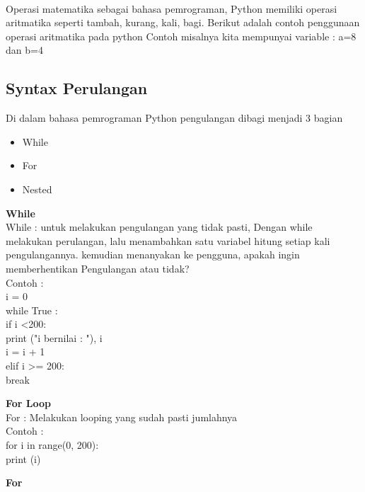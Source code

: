 \documentclass{article}
\begin{document}
\paragraph{}
Operasi matematika sebagai bahasa pemrograman, Python memiliki operasi aritmatika seperti tambah, kurang, kali, bagi. Berikut adalah contoh penggunaan operasi aritmatika pada python
Contoh misalnya kita mempunyai variable : a=8 dan b=4\\

\subsection{Syntax Perulangan}

\item Di dalam bahasa pemrograman Python pengulangan dibagi menjadi 3 bagian

\begin{itemize}
    \item While 
    \item For 
    \item Nested
\end{itemize}

\item \textbf{While} \\ 
While : untuk melakukan pengulangan yang tidak pasti, Dengan while melakukan perulangan, lalu menambahkan satu variabel hitung setiap kali pengulangannya. kemudian menanyakan ke pengguna, apakah ingin memberhentikan Pengulangan atau tidak?\\
Contoh :\\
i = 0\\
while True :\\
    if i \textless 200:\\
        print ("i bernilai : "), i\\
        i = i + 1\\
    elif i \textgreater = 200:\\
        break\\
        
\item \textbf{For Loop}\\
For : Melakukan looping yang sudah pasti jumlahnya\\
Contoh :\\
for i in range(0, 200):\\
    print (i)\\
    
\item \textbf{For}
\end{document}
